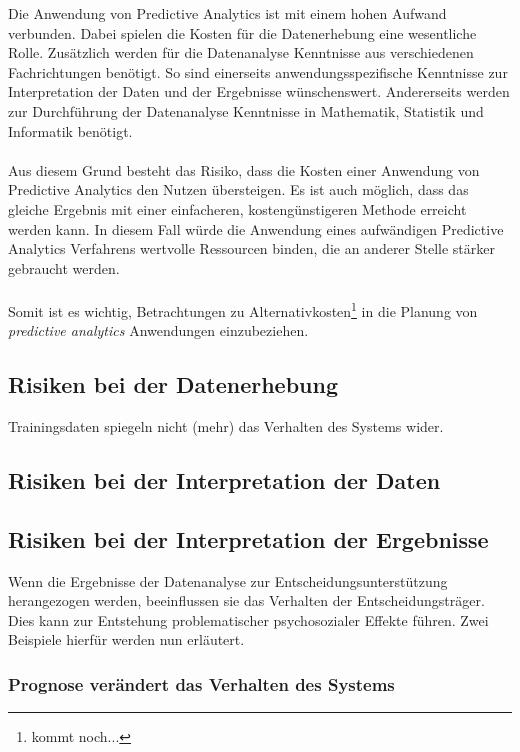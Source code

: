 Die Anwendung von Predictive Analytics ist mit einem hohen Aufwand verbunden.
Dabei spielen die Kosten für die Datenerhebung eine wesentliche Rolle.
Zusätzlich werden für die Datenanalyse Kenntnisse aus verschiedenen
Fachrichtungen benötigt. So sind einerseits anwendungsspezifische Kenntnisse
zur Interpretation der Daten und der Ergebnisse wünschenswert. Andererseits
werden zur Durchführung der Datenanalyse Kenntnisse in Mathematik, Statistik und
Informatik benötigt. \\ \\
Aus diesem Grund besteht das Risiko, dass die Kosten einer Anwendung von
Predictive Analytics den Nutzen übersteigen. Es ist auch möglich, dass das
gleiche Ergebnis mit einer einfacheren, kostengünstigeren Methode erreicht
werden kann. In diesem Fall würde die Anwendung eines aufwändigen Predictive
Analytics Verfahrens wertvolle Ressourcen binden, die an anderer Stelle stärker
gebraucht werden. \\ \\
Somit ist es wichtig, Betrachtungen zu Alternativkosten\footnote{
kommt noch...
}
in die Planung von \emph{predictive analytics} Anwendungen einzubeziehen. 

\subsection{Risiken bei der Datenerhebung}

Trainingsdaten spiegeln nicht (mehr) das Verhalten des Systems wider.

\subsection{Risiken bei der Interpretation der Daten}

\subsection{Risiken bei der Interpretation der Ergebnisse}

Wenn die Ergebnisse der Datenanalyse zur Entscheidungsunterstützung herangezogen
werden, beeinflussen sie das Verhalten der Entscheidungsträger. Dies kann zur
Entstehung problematischer psychosozialer Effekte führen. Zwei Beispiele hierfür
werden nun erläutert.

\subsubsection{Prognose verändert das Verhalten des Systems }

